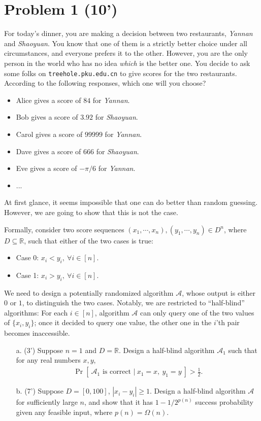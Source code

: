 \section*{Problem 1 (10')}
For today's dinner, you are making a decision between two restaurants, \textit{Yannan} and \textit{Shaoyuan}. You know that one of them is a strictly better choice under all circumstances, and everyone prefers it to the other. However, you are the only person in the world who has no idea \textit{which} is the better one. You decide to ask some folks on \texttt{treehole.pku.edu.cn} to give scores for the two restaurants. According to the following responses, which one will you choose?
\begin{itemize}
    \item Alice gives a score of $84$ for \textit{Yannan}.
    \item Bob gives a score of $3.92$ for \textit{Shaoyuan}.
    \item Carol gives a score of $99999$ for \textit{Yannan}.
    \item Dave gives a score of $666$ for \textit{Shaoyuan}.
    \item Eve gives a score of $-\pi/6$ for \textit{Yannan}.
    \item ...
\end{itemize}
At first glance, it seems impossible that one can do better than random guessing. However, we are going to show that this is not the case. 

Formally, consider two score sequences $(x_1, \cdots, x_n), (y_1, \cdots, y_n) \in D^n$, where $D \subseteq \mathbb{R}$, such that either of the two cases is true:
\begin{itemize}
    \item Case 0: $x_i < y_i, \ \forall i\in [n]$. 
    \item Case 1: $x_i > y_i, \ \forall i\in [n]$. 
\end{itemize}
We need to design a potentially randomized algorithm $\mathcal{A}$, whose output is either $0$ or $1$, to distinguish the two cases. Notably, we are restricted to ``half-blind'' algorithms: For each $i\in [n]$, algorithm $\mathcal{A}$ can only query one of the two values of $\{x_i,y_i\}$; once it decided to query one value, the other one in the $i$'th pair becomes inaccessible. 

\begin{itemize}
    \item [a.] (3') Suppose $n=1$ and $D = \mathbb{R}$. Design a half-blind algorithm $\mathcal{A}_1$ such that for any real numbers $x, y$,
    \begin{align*}
    \Pr\left[\ \mathcal{A}_1\text{ is correct } | \ x_1 = x, \  y_1 = y \ \right] > \frac{1}{2}.
    \end{align*}
    \item [b.] (7') Suppose $D = [0,100]$, $|x_i -y_i| \geq 1$. Design a half-blind algorithm $\mathcal{A}$ for sufficiently large $n$, and show that it has $1-1/2^{p(n)}$ success probability given any feasible input, where $p(n) = \Omega(n)$.
\end{itemize}

